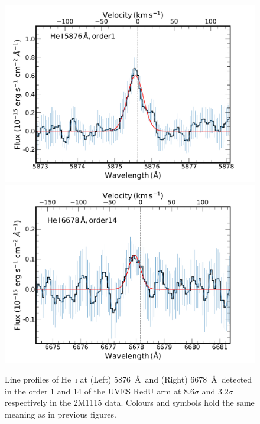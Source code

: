 \documentclass{aa}
\newcommand{\Hei}{He~\textsc{i}\xspace}
\begin{document}
\begin{appendix}
\begin{figure}
\centering
\includegraphics[width=0.49\linewidth]{He_5875.pdf}
\includegraphics[width=0.49\linewidth]{He_6678.pdf}
\caption{Line profiles of \Hei at (Left) 5876~\AA\ and (Right) 6678~\AA\ detected in the order 1 and 14 of the UVES RedU arm at $8.6\sigma$ and $3.2\sigma$ respectively in the 2M1115 data. Colours and symbols hold the same meaning as in previous figures.}
\label{HeI}
\end{figure}



\end{appendix}
\end{document}
